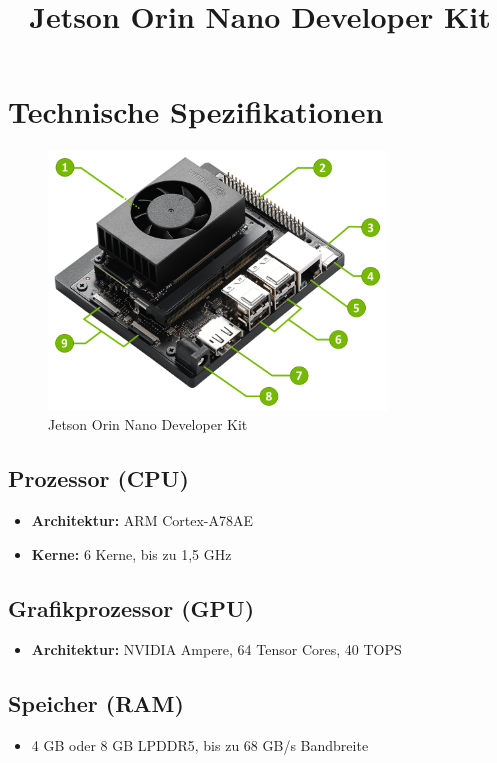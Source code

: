 \documentclass{article}
\title{Jetson Orin Nano Developer Kit}
\author{}
\date{}
\begin{document}
\maketitle
\section{Technische Spezifikationen}

\begin{figure}[h!]
    \centering

    \includegraphics[width=0.8\textwidth]{jetsonOrinNano8GB.png} 

    \caption{Jetson Orin Nano Developer Kit}
\end{figure}
\subsection{Prozessor (CPU)}
\begin{itemize}
    \item \textbf{Architektur:} ARM Cortex-A78AE
    \item \textbf{Kerne:} 6 Kerne, bis zu 1,5 GHz
\end{itemize}

\subsection{Grafikprozessor (GPU)}
\begin{itemize}
    \item \textbf{Architektur:} NVIDIA Ampere, 64 Tensor Cores, 40 TOPS
\end{itemize}

\subsection{Speicher (RAM)}
\begin{itemize}
    \item 4 GB oder 8 GB LPDDR5, bis zu 68 GB/s Bandbreite
\end{itemize}
\end{document}
